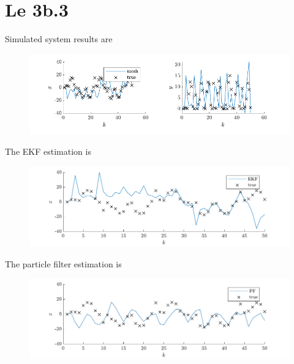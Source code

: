 \section{Le 3b.3}
Simulated system results are
\begin{figure}[!h]
    \centering
    \includegraphics{figures/ex4_c_sim.pdf}
\end{figure}

The EKF estimation is 
\begin{figure}[!h]
    \centering
    \includegraphics{figures/ex4_c_EKF.pdf}
\end{figure}

The particle filter estimation is 
\begin{figure}[!h]
    \centering
    \includegraphics{figures/ex4_c_PF.pdf}
\end{figure}